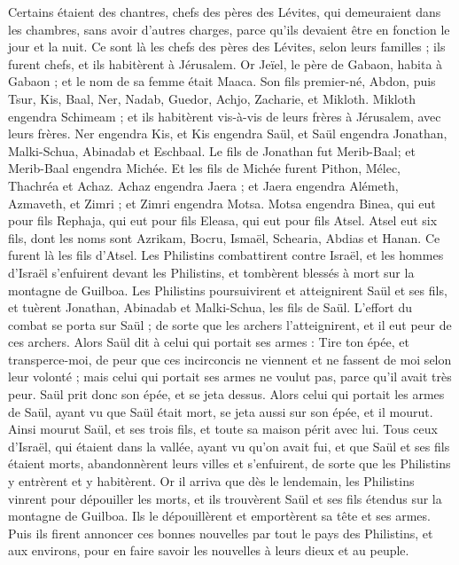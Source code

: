 \begin{multicols}{2}
Certains étaient des chantres, chefs des pères des Lévites, qui demeuraient dans les chambres, sans avoir d’autres charges, parce qu'ils devaient être en fonction le jour et la nuit.
Ce sont là les chefs des pères des Lévites, selon leurs familles ; ils furent chefs, et ils habitèrent à Jérusalem.
Or Jeïel, le père de Gabaon, habita à Gabaon ; et le nom de sa femme était Maaca.
Son fils premier-né, Abdon, puis Tsur, Kis, Baal, Ner, Nadab,
Guedor, Achjo, Zacharie, et Mikloth.
Mikloth engendra Schimeam ; et ils habitèrent vis-à-vis de leurs frères à Jérusalem, avec leurs frères.
Ner engendra Kis, et Kis engendra Saül, et Saül engendra Jonathan, Malki-Schua, Abinadab et Eschbaal.
Le fils de Jonathan fut  Merib-Baal; et Merib-Baal engendra Michée.
Et les fils de Michée furent Pithon, Mélec, Thachréa et Achaz.
Achaz engendra Jaera ; et Jaera engendra Alémeth, Azmaveth, et Zimri ; et Zimri engendra Motsa.
Motsa engendra Binea, qui eut pour fils Rephaja, qui eut pour fils Eleasa, qui eut pour fils Atsel.
Atsel eut six fils, dont les noms sont Azrikam, Bocru, Ismaël, Schearia, Abdias et Hanan. Ce furent là les fils d'Atsel.
\VerseOne{}Les Philistins combattirent contre Israël, et les hommes d'Israël s'enfuirent devant les Philistins, et tombèrent blessés à mort sur la montagne de Guilboa.
Les Philistins poursuivirent et atteignirent Saül et ses fils, et tuèrent Jonathan, Abinadab et Malki-Schua, les fils de Saül.
L’effort du combat se porta sur Saül ; de sorte que les archers l'atteignirent, et il eut peur de ces archers.
Alors Saül dit à celui qui portait ses armes : Tire ton épée, et transperce-moi, de peur que ces incirconcis ne viennent et ne fassent de moi selon leur volonté ; mais celui qui portait ses armes ne voulut pas, parce qu’il avait très peur. Saül prit donc son épée, et se jeta dessus.
Alors celui qui portait les armes de Saül, ayant vu que Saül était mort, se jeta aussi sur son épée, et il mourut.
Ainsi mourut Saül, et ses trois fils, et toute sa maison périt avec lui.
Tous ceux d'Israël, qui étaient dans la vallée, ayant vu qu'on avait fui, et que Saül et ses fils étaient morts, abandonnèrent leurs villes et s'enfuirent, de sorte que les Philistins y entrèrent et y habitèrent.
Or il arriva que dès le lendemain, les Philistins vinrent pour dépouiller les morts, et ils trouvèrent Saül et ses fils étendus sur la montagne de Guilboa.
Ils le dépouillèrent et emportèrent sa tête et ses armes. Puis ils firent annoncer ces bonnes nouvelles par tout le pays des Philistins, et aux environs, pour en faire savoir les nouvelles à leurs dieux et au peuple.

\end{multicols}
